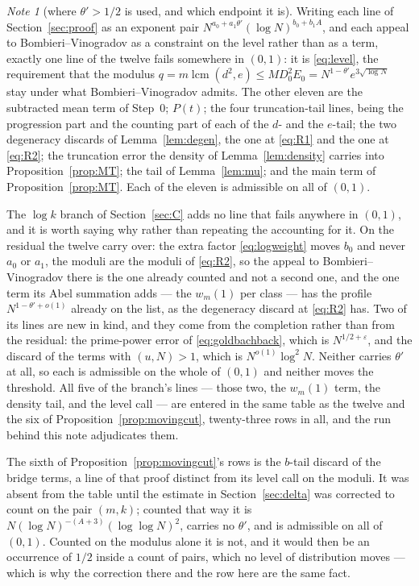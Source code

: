 \documentclass[11pt,a4paper]{article}
\theoremstyle{plain}
\theoremstyle{definition}
\theoremstyle{remark}
\newtheorem{note}[theorem]{Note}
\DeclareMathOperator{\lcm}{lcm}
\begin{document}
\begin{note}[where \texorpdfstring{$\theta'>1/2$}{the exponent
condition} is used, and which endpoint it
is]\label{note:halfline}
Writing each line of Section~\ref{sec:proof} as an exponent pair
$N^{a_0+a_1\theta'}(\log N)^{b_0+b_1A}$, and each appeal to
Bombieri--Vinogradov as a constraint on the level rather than as a
term, exactly one line of the twelve fails somewhere in $(0,1)$: it is
\eqref{eq:level}, the requirement that the modulus
$q=m\lcm(d^2,e)\le MD_0^2E_0=N^{1-\theta'}e^{3\sqrt{\log N}}$ stay under
what Bombieri--Vinogradov admits. The other eleven are the subtracted
mean term of Step~0; $P(t)$; the four truncation-tail lines, being the
progression part and the counting part of each of the $d$- and the
$e$-tail; the two degeneracy discards of Lemma~\ref{lem:degen}, the one
at \eqref{eq:R1} and the one at \eqref{eq:R2}; the truncation error the
density of Lemma~\ref{lem:density} carries into
Proposition~\ref{prop:MT}; the tail of Lemma~\ref{lem:mu}; and
the main term of Proposition~\ref{prop:MT}. Each of the eleven is
admissible on all of $(0,1)$.

The $\log k$ branch of Section~\ref{sec:C} adds no line that fails
anywhere in $(0,1)$, and it is worth saying why rather than repeating
the accounting for it. On the residual the twelve carry over: the
extra factor \eqref{eq:logweight} moves $b_0$ and never $a_0$ or
$a_1$, the moduli are the moduli of \eqref{eq:R2}, so the appeal to
Bombieri--Vinogradov there is the one already counted and not a second
one, and the one term its Abel summation adds --- the $w_m(1)$ per
class --- has the profile $N^{1-\theta'+o(1)}$ already on the list, as
the degeneracy discard at \eqref{eq:R2} has. Two of its lines are new
in kind, and they come from the completion rather than from the
residual: the prime-power error of \eqref{eq:goldbachback}, which is
$N^{1/2+\varepsilon}$, and the discard of the terms with $(u,N)>1$,
which is $N^{o(1)}\log^2N$. Neither carries $\theta'$ at all, so each
is admissible on the whole of $(0,1)$ and neither moves the
threshold. All five of the branch's lines --- those two, the
$w_m(1)$ term, the density tail, and the level call --- are entered in
the same table as the twelve and the six of
Proposition~\ref{prop:movingcut}, twenty-three rows in all, and the run
behind this note adjudicates them.

The sixth of Proposition~\ref{prop:movingcut}'s rows is the $b$-tail
discard of the bridge terms, a line of that proof distinct from its
level call on the moduli. It was absent from the table until the
estimate in Section~\ref{sec:delta} was corrected to count on the pair
$(m,k)$; counted that way it is $N(\log N)^{-(A+3)}(\log\log N)^2$,
carries no $\theta'$, and is admissible on all of $(0,1)$. Counted on
the modulus alone it is not, and it would then be an occurrence of
$1/2$ inside a count of pairs, which no level of distribution moves ---
which is why the correction there and the row here are the same fact.


\end{note}
\end{document}
